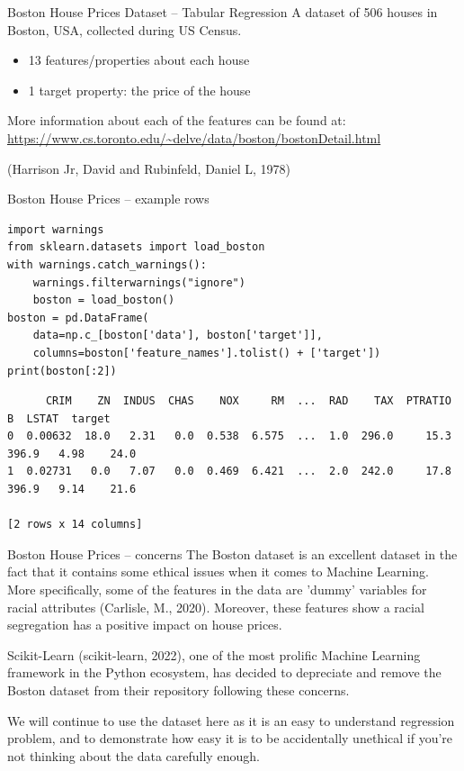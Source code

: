 \documentclass[10pt]{beamer}
\begin{document}
\begin{frame}[label={sec:org27182e4}]{Boston House Prices Dataset -- Tabular Regression}
A dataset of 506 houses in Boston, USA, collected during US Census.

\begin{itemize}
\item 13 features/properties about each house
\item 1 target property: the price of the house
\end{itemize}

More information about each of the features can be found at: \url{https://www.cs.toronto.edu/\~delve/data/boston/bostonDetail.html}

(Harrison Jr, David and Rubinfeld, Daniel L, 1978)
\end{frame}

\begin{frame}[label={sec:org31db6e5},fragile]{Boston House Prices -- example rows}
 \begin{verbatim}
import warnings
from sklearn.datasets import load_boston
with warnings.catch_warnings():
    warnings.filterwarnings("ignore")
    boston = load_boston()
boston = pd.DataFrame(
    data=np.c_[boston['data'], boston['target']],
    columns=boston['feature_names'].tolist() + ['target'])
print(boston[:2])
\end{verbatim}

\begin{verbatim}
      CRIM    ZN  INDUS  CHAS    NOX     RM  ...  RAD    TAX  PTRATIO      B  LSTAT  target
0  0.00632  18.0   2.31   0.0  0.538  6.575  ...  1.0  296.0     15.3  396.9   4.98    24.0
1  0.02731   0.0   7.07   0.0  0.469  6.421  ...  2.0  242.0     17.8  396.9   9.14    21.6

[2 rows x 14 columns]
\end{verbatim}
\end{frame}

\begin{frame}[label={sec:orgc4cf7b4}]{Boston House Prices -- concerns}
The Boston dataset is an excellent dataset in the fact that it contains some ethical
issues when it comes to Machine Learning. More specifically, some of the features in
the data are 'dummy' variables for racial attributes (Carlisle, M., 2020). Moreover, these features show a
racial segregation has a positive impact on house prices.

Scikit-Learn (scikit-learn, 2022), one of the most prolific Machine Learning framework in the Python
ecosystem, has decided to depreciate and remove the Boston dataset from their
repository following these concerns.

We will continue to use the dataset here as it is an easy to understand regression
problem, and to demonstrate how easy it is to be accidentally unethical if you're not
thinking about the data carefully enough. 
\end{frame}
\end{document}
